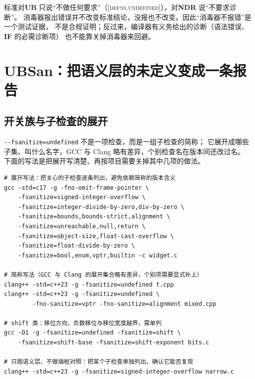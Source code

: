 \documentclass[12pt,a4paper,fontset=fandol]{ctexbook}
\newcommand{\Opt}[1]{\texttt{-\/-#1}}
\newcommand{\UB}{\textbf{\textsf{UB}}}
\newcommand{\NDR}{\textbf{\textsf{NDR}}}
\newcommand{\ILLF}{\textbf{\textsf{IF}}}
\newcommand{\Std}[1]{\textsc{[#1]}}
\begin{document}
\begin{clause}[title={工具不是合规裁判}]
标准对\UB{} 只说“不做任何要求”（\Std{defns.undefined}），对\NDR{} 说“不要求诊断”。
消毒器报出错误并不改变标准结论，没报也不改变。因此“消毒器不报错”是一个测试证据，
不是合规证明；反过来，编译器有义务给出的诊断（语法错误、\ILLF{} 的必需诊断项）
也不能靠关掉消毒器来回避。
\end{clause}

\section{UBSan：把语义层的未定义变成一条报告}\label{sec:ub03-ubsan}

\subsection{开关族与子检查的展开}\label{sec:ub03-ubsan-expansion}

\Opt{fsanitize=undefined} 不是一项检查，而是一组子检查的简称；
它展开成哪些子集、叫什么名字，GCC 与 Clang 略有差异，个别检查名在版本间还改过名。
下面的写法是把展开写清楚、再按项目需要关掉其中几项的做法。

\begin{lstlisting}[style=shellstyle, language=ShellUB, caption={UBSan 开关族：展开、关项与定位增强}]
# 展开写法：把关心的子检查逐条列出，避免依赖简称的版本含义
gcc -std=c17 -g -fno-omit-frame-pointer \
    -fsanitize=signed-integer-overflow \
    -fsanitize=integer-divide-by-zero,div-by-zero \
    -fsanitize=bounds,bounds-strict,alignment \
    -fsanitize=unreachable,null,return \
    -fsanitize=object-size,float-cast-overflow \
    -fsanitize=float-divide-by-zero \
    -fsanitize=bool,enum,vptr,builtin -c widget.c

# 简称写法（GCC 与 Clang 的展开集合略有差异，个别项需要显式补上）
clang++ -std=c++23 -g -fsanitize=undefined t.cpp
clang++ -std=c++23 -g -fsanitize=undefined \
        -fno-sanitize=vptr -fno-sanitize=alignment mixed.cpp

# shift 类：移位方向、负数移位与移位宽度越界，需单列
gcc -O1 -g -fsanitize=undefined -fsanitize=shift \
    -fsanitize=shift-base -fsanitize=shift-exponent bits.c

# 只跑语义层、不做插桩对照：把某个子检查单独列出，确认它能否复现
clang++ -std=c++23 -g -fsanitize=signed-integer-overflow narrow.c
\end{lstlisting}
\end{document}
